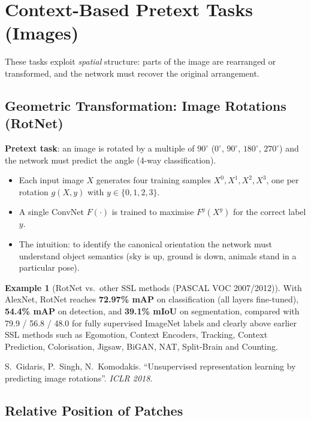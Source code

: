 \documentclass[11pt,a4paper]{article}
\theoremstyle{definition}
\newtheorem{example}{Example}[section]
\theoremstyle{plain}
\theoremstyle{remark}
\begin{document}
\section{Context-Based Pretext Tasks (Images)}

These tasks exploit \emph{spatial} structure: parts of the image are rearranged or transformed, and the network must recover the original arrangement.

\subsection{Geometric Transformation: Image Rotations (RotNet)}

\textbf{Pretext task}: an image is rotated by a multiple of $90^{\circ}$ ($0^{\circ}$, $90^{\circ}$, $180^{\circ}$, $270^{\circ}$) and the network must predict the angle (4-way classification).

\begin{itemize}
    \item Each input image $X$ generates four training samples $X^{0}, X^{1}, X^{2}, X^{3}$, one per rotation $g(X, y)$ with $y \in \{0,1,2,3\}$.
    \item A single ConvNet $F(\cdot)$ is trained to maximise $F^{y}(X^{y})$ for the correct label $y$.
    \item The intuition: to identify the canonical orientation the network must understand object semantics (sky is up, ground is down, animals stand in a particular pose).
\end{itemize}

\begin{example}[RotNet vs.\ other SSL methods (PASCAL VOC 2007/2012)]
With AlexNet, RotNet reaches \textbf{72.97\% mAP} on classification (all layers fine-tuned), \textbf{54.4\% mAP} on detection, and \textbf{39.1\% mIoU} on segmentation, compared with 79.9 / 56.8 / 48.0 for fully supervised ImageNet labels and clearly above earlier SSL methods such as Egomotion, Context Encoders, Tracking, Context Prediction, Colorisation, Jigsaw, BiGAN, NAT, Split-Brain and Counting.
\end{example}

\begin{tcolorbox}[colback=blue!5!white,colframe=blue!60!black,title={Reference}]
S.\ Gidaris, P.\ Singh, N.\ Komodakis. ``Unsupervised representation learning by predicting image rotations''. \textit{ICLR 2018}.
\end{tcolorbox}

\subsection{Relative Position of Patches}
\end{document}
